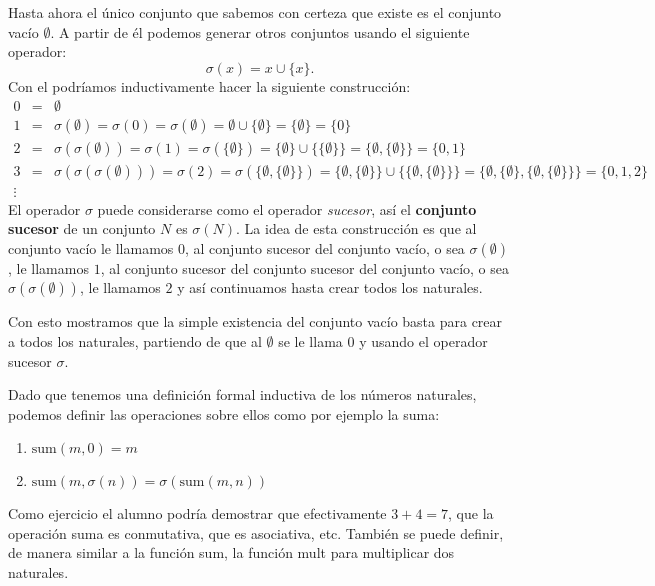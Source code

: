 \begin{ejemplo}
Hasta ahora el único conjunto que sabemos con certeza que existe es el conjunto vacío $\emptyset$.
A partir de él podemos generar otros conjuntos usando el siguiente operador:
\[
\sigma(x)=x\cup\{x\}.
\]
Con el podríamos inductivamente hacer la siguiente construcción:
\[
\begin{array}{rcll}
0 & = & \emptyset \\
1 & = & \sigma(\emptyset) = \sigma(0) = \sigma(\emptyset) = \emptyset\cup\{\emptyset\} = \{\emptyset\} = \{0\}\\
2 & = & \sigma(\sigma(\emptyset)) = \sigma(1) = \sigma(\{\emptyset\}) = \{\emptyset\}\cup\{\{\emptyset\}\} = \{\emptyset,\{\emptyset\}\} = \{0,1\} \\
3 & = & \sigma(\sigma(\sigma(\emptyset))) = \sigma(2) = \sigma(\{\emptyset,\{\emptyset\}\}) = \{\emptyset,\{\emptyset\}\}\cup\{\{\emptyset,\{\emptyset\}\}\} = \{\emptyset,\{\emptyset\},\{\emptyset,\{\emptyset\}\}\} = \{0,1,2\}\\
\vdots
\end{array}
\]
El operador $\sigma$ puede considerarse como el operador \emph{sucesor}, así el {\bf conjunto sucesor} de un conjunto $N$ es $\sigma(N)$.
La idea de esta construcción es que al conjunto vacío le llamamos $0$, al conjunto sucesor del conjunto vacío, o sea $\sigma(\emptyset)$, le llamamos $1$, al conjunto sucesor del conjunto sucesor del conjunto vacío, o sea $\sigma(\sigma(\emptyset))$, le llamamos $2$ y así continuamos hasta crear todos los naturales.

Con esto mostramos que la simple existencia del conjunto vacío basta para crear a todos los naturales, partiendo de que al $\emptyset$ se le llama $0$ y usando el operador sucesor $\sigma$.

Dado que tenemos una definición formal inductiva de los números naturales, podemos definir las operaciones sobre ellos como por ejemplo la suma:
\begin{enumerate}
	\itemsep 0pt
	\item $\text{sum}(m,0)=m$
	\item $\text{sum}(m,\sigma(n))=\sigma(\text{sum}(m,n))$
\end{enumerate}
Como ejercicio el alumno podría demostrar que efectivamente $3+4=7$, que la operación suma es conmutativa, que es asociativa, etc.
También se puede definir, de manera similar a la función sum, la función mult para multiplicar dos naturales.
\end{ejemplo}

